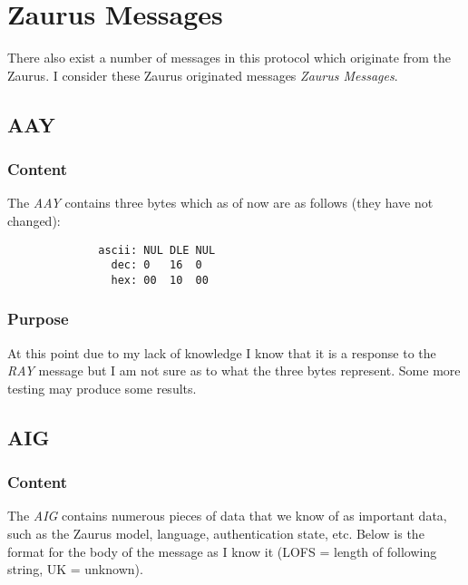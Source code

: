     \section{Zaurus Messages}

    \label{zaurus:msgs}
    There also exist a number of messages in this protocol which originate
    from the Zaurus. I consider these Zaurus originated messages
    \emph{Zaurus Messages}.

        \subsection{AAY}

            \subsubsection{Content}

            The \emph{AAY} contains three bytes which as of now are as
            follows (they have not changed):

            \begin{verbatim}
              ascii: NUL DLE NUL
                dec: 0   16  0
                hex: 00  10  00
            \end{verbatim}

            \subsubsection{Purpose}

            At this point due to my lack of knowledge I know that it is a
            response to the \emph{RAY} message but I am not sure as to what
            the three bytes represent. Some more testing may produce some
            results.

        \subsection{AIG}
        \label{zmsg:aig}
            \subsubsection{Content}

            The \emph{AIG} contains numerous pieces of data that we know of as
            important data, such as the Zaurus model, language, authentication
            state, etc. Below is the format for the body of the message as I
            know it (LOFS = length of following string, UK = unknown).

